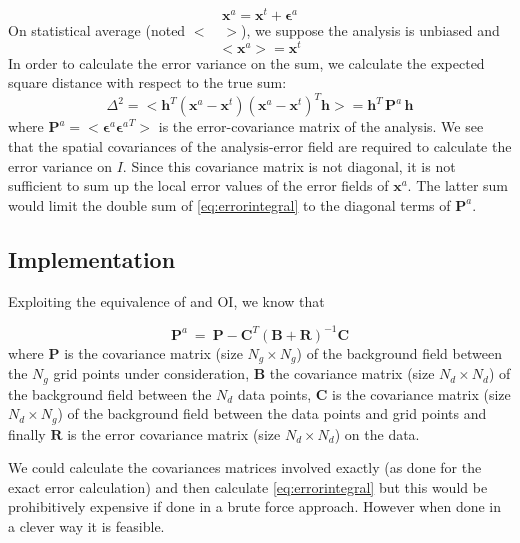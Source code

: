 \begin{equation}
{\mathbf{x}^a} = \mathbf{x}^t + \mathbf{\epsilon}^a
\end{equation}
On statistical average (noted $< \quad >$), we suppose the analysis is unbiased and
\begin{equation}
<{\mathbf{x}^a}> = \mathbf{x}^t 
\end{equation}
In order to calculate the error variance on the sum, we calculate the expected square distance with respect to the true sum:
\begin{equation}
\Delta^2 = < \mathbf{h}^T( {\mathbf{x}^a} - \mathbf{x}^t) ({\mathbf{x}^a} - \mathbf{x}^t )^T \mathbf{h} > = \mathbf{h}^T \, \mathbf{P}^a \, \mathbf{h}
\label{eq:errorintegral}
\end{equation}
where $\mathbf{P}^a = <\mathbf{\epsilon}^a {\mathbf{\epsilon}^a}^T >$ is the error-covariance matrix of the analysis.
We see that the spatial covariances of the analysis-error field are required to calculate the error variance on $I$. Since this
covariance matrix is not diagonal, it is not sufficient to sum up the local error values of the error fields of $\mathbf{x}^a$. The latter sum would limit
the double sum of \eqref{eq:errorintegral} to the diagonal terms of $\mathbf{P}^a$.


\subsection{Implementation}
Exploiting the equivalence of \diva and OI, we know that

\begin{equation}
\mathbf{P}^a ~=~ \mathbf{P} -  \mathbf{C}^T \left( \mathbf{B}+\mathbf{R} \right)^{-1} \mathbf{C}
\label{eq:covariance}
\end{equation}
where $\mathbf{P}$ is the covariance matrix (size $N_g\times N_g$) of the background field between the $N_g$ grid points under consideration, $\mathbf{B}$ 
the covariance matrix (size $N_d \times N_d$) of the background field between the $N_d$ data points, $\mathbf{C}$  is the
 covariance matrix (size $N_d \times N_g$) of the background field between the  data points and grid points and finally $\mathbf{R}$ is the error covariance matrix (size $N_d \times N_d$) on the data.
 
We could calculate the covariances matrices involved exactly (as done for the exact error calculation) and then calculate \eqref{eq:errorintegral} but this would be prohibitively expensive if done in a brute force approach. However when done in a clever way it is feasible.

